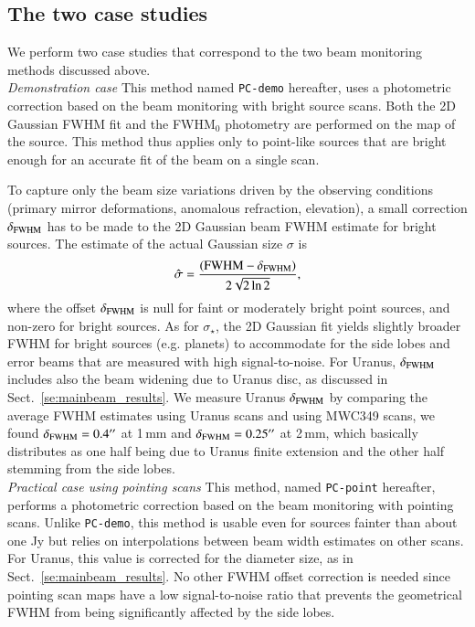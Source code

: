 \documentclass[traditionalabstract]{aa}
\newcommand{\nico}[1]{#1}
\begin{document}
\begin{appendix}
\subsection{The two case studies}

We perform two case studies that correspond to the two beam monitoring
methods discussed above.\\

\noindent \emph{Demonstration case} This method named {\tt PC-demo} hereafter, uses a
photometric correction based on the beam monitoring with bright source
scans. Both the 2D Gaussian FWHM fit and the FWHM$_0$ photometry are performed
on the map of the source. This method thus applies only to point-like sources
that are bright enough for an accurate fit of the beam on a single scan.

To capture only the beam size variations driven by the
observing conditions (primary mirror deformations, anomalous
refraction, elevation), a small correction $\delta_{\rm{FWHM}}$ has to be made to
the 2D Gaussian beam FWHM estimate for bright sources. The estimate of the
actual Gaussian size $\sigma$ is
\begin{equation}
  \hat{\sigma} = \frac{(\rm{FWHM} - \delta_{\rm{FWHM}})}{2\sqrt{2 \ln{2}}}, 
\end{equation} 
where the offset $\delta_{\rm{FWHM}}$ is null for faint or moderately
bright point sources, and non-zero for bright sources.
As for $\sigma_\star$, the 2D Gaussian fit yields slightly broader
FWHM for bright sources (e.g. planets) to accommodate
for the side lobes and error beams that are measured with high signal-to-noise.
For Uranus, $\delta_{\rm{FWHM}}$ includes also the beam widening due
to Uranus disc, as discussed in Sect.~\ref{se:mainbeam_results}.
We measure Uranus $\delta_{\rm{FWHM}}$
by comparing the average %
FWHM estimates using Uranus
scans and using MWC349 scans, we found $\delta_{\rm{FWHM}} = 0.4''$ at
1\,mm and $\delta_{\rm{FWHM}} = 0.25''$ at 2\,mm, which basically
distributes as one half being due to Uranus finite extension and the
other half stemming from the side lobes.\\

\noindent \emph{Practical case using pointing scans} This method,
named {\tt PC-point} hereafter, performs a photometric correction based on the beam monitoring with
pointing scans. 
Unlike {\tt PC-demo}, this method is usable even for sources fainter than
about one Jy \nico{but relies on interpolations between beam width estimates on
  other scans}. For Uranus, this value is corrected for the diameter size, as in
Sect.~\ref{se:mainbeam_results}. No other FWHM offset correction is needed since
pointing scan maps have a low signal-to-noise ratio that prevents the
geometrical FWHM from being significantly affected by the side lobes.



\end{appendix}
\end{document}
